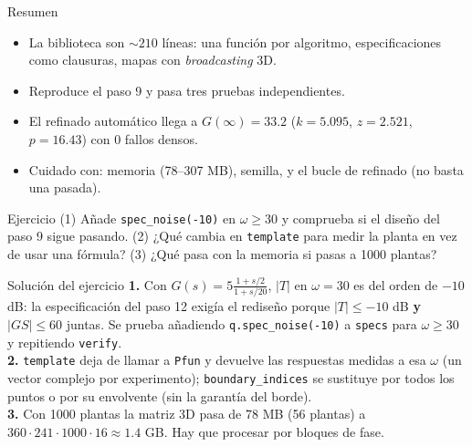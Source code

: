 \documentclass[aspectratio=169,11pt]{beamer}
\begin{document}
\begin{frame}{Resumen}
  \small
  \begin{itemize}
    \item La biblioteca son $\sim210$ líneas: una función por algoritmo, especificaciones como clausuras, mapas con \emph{broadcasting} 3D.
    \item Reproduce el paso 9 y pasa tres pruebas independientes.
    \item El refinado automático llega a $G(\infty)=33.2$ ($k=5.095$, $z=2.521$, $p=16.43$) con 0 fallos densos.
    \item Cuidado con: memoria (78--307 MB), semilla, y el bucle de refinado (no basta una pasada).
  \end{itemize}
  \begin{block}{Ejercicio}
    (1) Añade \texttt{spec\_noise(-10)} en $\omega\ge30$ y comprueba si el diseño del paso 9 sigue pasando. (2) ¿Qué cambia en \texttt{template} para medir la planta en vez de usar una fórmula? (3) ¿Qué pasa con la memoria si pasas a 1000 plantas?
  \end{block}
\end{frame}

\appendix
\begin{frame}{Solución del ejercicio}
  \footnotesize
  \textbf{1.} Con $G(s)=5\frac{1+s/2}{1+s/20}$, $|T|$ en $\omega=30$ es del orden de $-10$ dB: la especificación del paso 12 exigía el rediseño porque $|T|\le-10$ dB \textbf{y} $|GS|\le60$ juntas. Se prueba añadiendo \texttt{q.spec\_noise(-10)} a \texttt{specs} para $\omega\ge30$ y repitiendo \texttt{verify}.\\[3pt]
  \textbf{2.} \texttt{template} deja de llamar a \texttt{Pfun} y devuelve las respuestas medidas a esa $\omega$ (un vector complejo por experimento); \texttt{boundary\_indices} se sustituye por todos los puntos o por su envolvente (sin la garantía del borde).\\[3pt]
  \textbf{3.} Con 1000 plantas la matriz 3D pasa de 78 MB (56 plantas) a $360\cdot241\cdot1000\cdot16\approx1.4$ GB. Hay que procesar por bloques de fase.
\end{frame}
\end{document}
